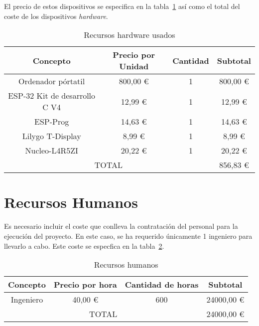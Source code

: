 El precio de estos dispositivos se especifica en la tabla~\ref{tab:recursos_hardware} así como el total del coste de los dispositivos \textit{hardware}.

\begin{table}[H]
\centering
\begin{tabular}{|c|c|c|c|}
\hline
Concepto                & Precio por Unidad & Cantidad & Subtotal \\ \hline
Ordenador pórtatil      & 800,00 \euro                & 1        & 800,00 \euro       \\ \hline
ESP-32 Kit de desarrollo C V4  & 12,99 \euro          & 1        & 12,99  \euro       \\ \hline
ESP-Prog                & 14,63  \euro                & 1        & 14,63  \euro       \\ \hline
Lilygo T-Display        & 8,99   \euro                & 1        & 8,99   \euro       \\ \hline
Nucleo-L4R5ZI           & 20,22  \euro                & 1        & 20,22  \euro       \\ \hline
\multicolumn{3}{|c|}{TOTAL}                                      & 856,83 \euro       \\ \hline
\end{tabular}
\caption{Recursos hardware usados}
\label{tab:recursos_hardware}
\end{table}


\section{Recursos Humanos}\label{sec:presupuesto-mano}

Es necesario incluir el coste que conlleva la contratación del personal para la ejecución del proyecto.
En este caso, se ha requerido únicamente 1 ingeniero para llevarlo a cabo.
Este coste se especfica en la tabla~\ref{tab:recursos_humanos}.

\begin{table}[H]
\centering
\begin{tabular}{|c|c|c|c|}
\hline
Concepto  & Precio por hora & Cantidad de horas & Subtotal \\ \hline
Ingeniero & 40,00 \euro     & 600               & 24000,00 \euro       \\ \hline
\multicolumn{3}{|c|}{TOTAL}                     & 24000,00 \euro        \\ \hline
\end{tabular}
\caption{Recursos humanos}
\label{tab:recursos_humanos}
\end{table}

